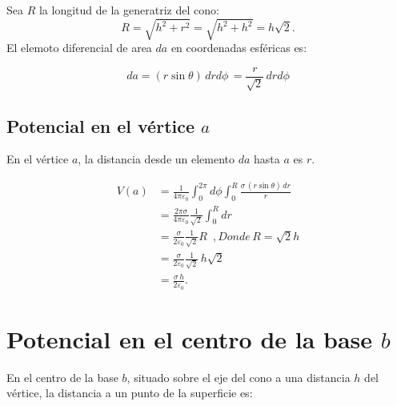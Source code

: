 \documentclass[12pt]{article}
\begin{document}
Sea $R$ la longitud de la generatriz del cono:
\[
  R=\sqrt{h^2+r^2}=\sqrt{h^2+h^2}=h\sqrt{2}.
\]
El elemoto diferencial de area $da$ en coordenadas esféricas es:

\[
  da = (r\sin\theta)\,drd\phi\, = \frac{r}{\sqrt{2}}\,drd\phi
\]
\subsection*{Potencial en el vértice $a$}
En el vértice $a$, la distancia desde un elemento $da$ hasta $a$ es $r$.

\begin{align*}
  V(a) &=\frac{1}{4\pi\varepsilon_0}\int_{0}^{2\pi}d\phi\int_{0}^{R}\frac{\sigma\,(r\sin\theta)\,dr}{r}\\
     &=\frac{2\pi\sigma}{4\pi\varepsilon_0} \frac{1}{\sqrt2}\int_{0}^{R}dr\\
     &=\frac{\sigma}{2\varepsilon_0}\frac{1}{\sqrt2}R\, \,\, ,Donde \, R=\sqrt2h\\
     &=\frac{\sigma}{2\varepsilon_0}\frac{1}{\sqrt2}\,h\sqrt2\\
     &=\frac{\sigma\,h}{2\varepsilon_0}.
\end{align*}

\section*{Potencial en el centro de la base $b$}
En el centro de la base $b$, situado sobre el eje del cono a una distancia $h$ del vértice, la distancia a un punto de la superficie es:
\end{document}
